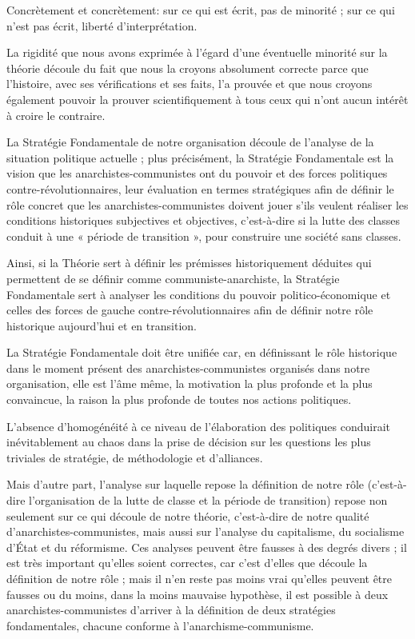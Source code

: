 Concrètement et concrètement: sur ce qui est écrit, pas de minorité ; sur ce qui n'est pas écrit, liberté d'interprétation.

La rigidité que nous avons exprimée à l'égard d'une éventuelle minorité sur la théorie découle du fait que nous la croyons absolument correcte parce que l'histoire, avec ses vérifications et ses faits, l'a prouvée et que nous croyons également pouvoir la prouver scientifiquement à tous ceux qui n'ont aucun intérêt à croire le contraire.

La Stratégie Fondamentale de notre organisation découle de l'analyse de la situation politique actuelle ; plus précisément, la Stratégie Fondamentale est la vision que les anarchistes-communistes ont du pouvoir et des forces politiques contre-révolutionnaires, leur évaluation en termes stratégiques afin de définir le rôle concret que les anarchistes-communistes doivent jouer s'ils veulent réaliser les conditions historiques subjectives et objectives, c'est-à-dire si la lutte des classes conduit à une « période de transition », pour construire une société sans classes.

Ainsi, si la Théorie sert à définir les prémisses historiquement déduites qui permettent de se définir comme communiste-anarchiste, la Stratégie Fondamentale sert à analyser les conditions du pouvoir politico-économique et celles des forces de gauche contre-révolutionnaires afin de définir notre rôle historique aujourd'hui et en transition.

La Stratégie Fondamentale doit être unifiée car, en définissant le rôle historique dans le moment présent des anarchistes-communistes organisés dans notre organisation, elle est l'âme même, la motivation la plus profonde et la plus convaincue, la raison la plus profonde de toutes nos actions politiques.

L'absence d'homogénéité à ce niveau de l'élaboration des politiques conduirait inévitablement au chaos dans la prise de décision sur les questions les plus triviales de stratégie, de méthodologie et d'alliances.

Mais d'autre part, l'analyse sur laquelle repose la définition de notre rôle (c'est-à-dire l'organisation de la lutte de classe et la période de transition) repose non seulement sur ce qui découle de notre théorie, c'est-à-dire de notre qualité d'anarchistes-communistes, mais aussi sur l'analyse du capitalisme, du socialisme d'État et du réformisme. Ces analyses peuvent être fausses à des degrés divers ; il est très important qu'elles soient correctes, car c'est d'elles que découle la définition de notre rôle ; mais il n'en reste pas moins vrai qu'elles peuvent être fausses ou du moins, dans la moins mauvaise hypothèse, il est possible à deux anarchistes-communistes d'arriver à la définition de deux stratégies fondamentales, chacune conforme à l'anarchisme-communisme.

